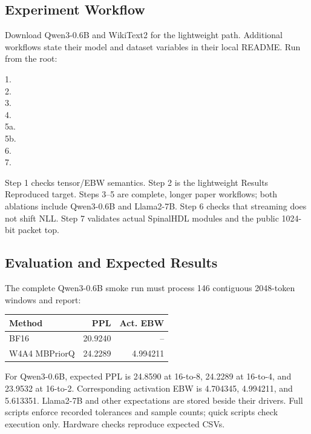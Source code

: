 \subsection{Experiment Workflow}
Download Qwen3-0.6B and WikiText2 for the lightweight path. Additional workflows state
their model and dataset variables in their local README. Run from the root:
{\scriptsize
\begin{flushleft}\setlength\parskip{0pt}
1. \\
2. \\
3. \\
4. \\
5a. \\
5b. \\
6. \\
7. 
\end{flushleft}
}
Step 1 checks tensor/EBW semantics. Step 2 is the lightweight Results Reproduced
target. Steps 3--5 are complete, longer paper workflows; both ablations include
Qwen3-0.6B and Llama2-7B. Step 6 checks that streaming does not shift NLL.
Step 7 validates actual SpinalHDL modules and the public 1024-bit packet top.

\subsection{Evaluation and Expected Results}
The complete Qwen3-0.6B smoke run must process 146 contiguous 2048-token windows and report:
\begin{center}
\small
\begin{tabular}{lrr}
\toprule
Method & PPL & Act. EBW \\
\midrule
BF16 & 20.9240 & -- \\
W4A4 MBPriorQ & 24.2289 & 4.994211 \\
\bottomrule
\end{tabular}
\end{center}
For Qwen3-0.6B, expected PPL is 24.8590 at 16-to-8, 24.2289 at 16-to-4,
and 23.9532 at 16-to-2. Corresponding activation EBW is 4.704345,
4.994211, and 5.613351. Llama2-7B and other expectations are stored beside
their drivers. Full scripts enforce recorded tolerances and sample counts;
quick scripts check execution only. Hardware checks reproduce expected CSVs.

